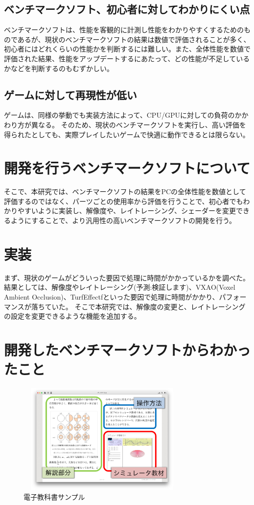\documentclass[twocolumn,10pt,a4j]{ltjsarticle}
\begin{document}
 \subsection{ベンチマークソフト、初心者に対してわかりにくい点}
ベンチマークソフトは、性能を客観的に計測し性能をわかりやすくするためのものであるが、現状のベンチマークソフトの結果は数値で評価されることが多く、初心者にはどれくらいの性能かを判断するには難しい。また、全体性能を数値で評価された結果、性能をアップデートするにあたって、どの性能が不足しているかなどを判断するのもむずかしい。

 \subsection{ゲームに対して再現性が低い}
ゲームは、同様の挙動でも実装方法によって、CPU/GPUに対しての負荷のかかわり方が異なる。
そのため、現状のベンチマークソフトを実行し、高い評価を得られたとしても、実際プレイしたいゲームで快適に動作できるとは限らない。

\section{開発を行うベンチマークソフトについて}
そこで、本研究では、ベンチマークソフトの結果をPCの全体性能を数値として評価するのではなく、パーツごとの使用率から評価を行うことで、初心者でもわかりやすいように実装し、解像度や、レイトレーシング、シェーダーを変更できるようにすることで、より汎用性の高いベンチマークソフトの開発を行う。

\section{実装}
まず、現状のゲームがどういった要因で処理に時間がかかっているかを調べた。
結果としては、解像度やレイトレーシング(予測:検証します)、VXAO(Voxel Ambient Occlusion)、TurfEffectfといった要因で処理に時間がかかり、パフォーマンスが落ちていた。
そこで本研究では、解像度の変更と、レイトレーシングの設定を変更できるような機能を追加する。

\section{開発したベンチマークソフトからわかったこと}



\begin{figure}[h]
\begin{center}
 \includegraphics[clip,width=85mm,height=55mm]{textbook.pdf}
\end{center}
 \caption{電子教科書サンプル}
 \label{fig:教科書}
\end{figure}
\end{document}
